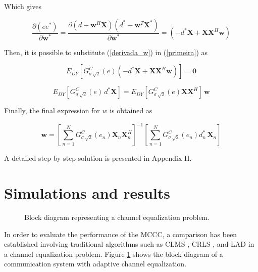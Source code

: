 \documentclass[preprint,12pt]{elsarticle}
\begin{document}
Which gives

\begin{equation}\label{derivada_w}
\frac{\partial (ee^*)}{\partial \textbf{w}^*} = \frac{\partial (d-\textbf{w}^{H}\textbf{X})(d^*-\textbf{w}^{T}\textbf{X}^*) }{\partial \textbf{w}^*} = (-d^*\textbf{X} + \textbf{XX}^{H}\textbf{w})
\end{equation}

Then, it is possible to substitute (\ref{derivada_w}) in (\ref{primeira}) as

\begin{equation}\nonumber
E_{DY}[G^{C}_{\sigma\,\sqrt{2}}(e) (-d^*\textbf{X} + \textbf{XX}^{H}\textbf{w}) ] = \textbf{0}
\end{equation}


\begin{equation}\label{deduzindo_passo3}
E_{DY}[G^{C}_{\sigma\,\sqrt{2}}(e)\,d^{*}\textbf{X}] = E_{DY}[G^{C}_{\sigma\,\sqrt{2}}(e)\textbf{XX}^{H}]\,\textbf{w}
\end{equation}

Finally, the final expression for $w$ is obtained as

\begin{equation}\label{finalpf}
\textbf{w} = \left [ \sum_{n=1}^{N} G^{C}_{\sigma\,\sqrt{2}}(e_{n})\textbf{X}_{n}\textbf{X}_{n}^{H} \right ]^{-1} \left [ \sum_{n=1}^{N} G^{C}_{\sigma\,\sqrt{2}}(e_{n})\textit{d}_{n}^{*}\,\textbf{X}_{n} \right ]
\end{equation}


A detailed step-by-step solution is presented in Appendix II.




\section{Simulations and results}
\label{results}

\begin{figure}[H] 
\centering

\caption{Block diagram representing a channel equalization problem.}
\label{figuraSistema}
\end{figure}






In order to evaluate the performance of the MCCC, a comparison has been established involving traditional algorithms such as CLMS \citep{mandic2009complex}, CRLS \citep{livroRLSComplexo}, and LAD \citep{algoritmolad} in a channel equalization problem.
Figure \ref{figuraSistema} shows the block diagram of a communication system with adaptive channel equalization.
\end{document}
